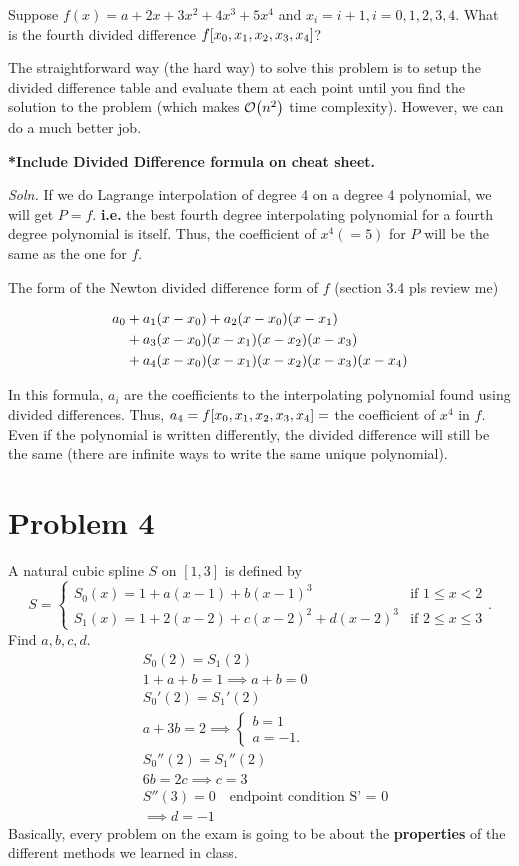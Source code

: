 \documentclass[12pt]{article}
\newcommand{\ie}{\textbf{i.e.}\xspace}
\newcommand{\soln}{\textit{Soln.}\xspace}
\begin{document}
Suppose $f(x) = a+2x+3x^2+4x^3+5x^4$ and $x_i = i+1, i=0,1,2,3,4$. What is the
fourth divided difference $f\bqty{x_0, x_1, x_2, x_3, x_4}$?

The straightforward way (the hard way) to solve this problem is to setup the
divided difference table and evaluate them at each point until you find the
solution to the problem (which makes $\order{n^2}$ time complexity). However,
we can do a much better job.

\textbf{*Include Divided Difference formula on cheat sheet.} 

\soln If we do Lagrange interpolation of degree 4 on a degree 4 polynomial, we
will get $P = f$. \ie the best fourth degree interpolating polynomial for a
fourth degree polynomial is itself. Thus, the coefficient of $x^4 ( = 5)$ for
$P$ will be the same as the one for $f$.

The form of the Newton divided difference form of $f$ (section 3.4 pls review me)

\begin{align*}
  a_0 &+ a_1\pqty{x-x_0} + a_2\pqty{x-x_0}\pqty{x-x_1} \\
      &+ a_3\pqty{x-x_0}\pqty{x-x_1}\pqty{x-x_2}\pqty{x-x_3} \\
      &+ a_4\pqty{x-x_0}\pqty{x-x_1}\pqty{x-x_2}\pqty{x-x_3}\pqty{x-x_4}
\end{align*}

In this formula, $a_i$ are the coefficients to the interpolating polynomial
found using divided differences. Thus, $a_4 = f\bqty{x_0, x_1, x_2, x_3, x_4} =$
the coefficient of $x^4$ in $f$. Even if the polynomial is written differently,
the divided difference will still be the same (there are infinite ways to write
the same unique polynomial).

\section{Problem 4}

A natural cubic spline $S$ on $[1,3]$ is defined by
\[
  S = \begin{cases}
    S_0(x) = 1+a(x-1)+b(x-1)^3 & \text{if } 1\leq x< 2\\
    S_1(x) = 1+2(x-2)+c(x-2)^2 + d(x-2)^3 & \text{if } 2\leq x\leq 3
  \end{cases}
.\]
Find $a,b,c,d$.
\begin{align*}
  &S_0(2) = S_1(2) \\
  &1+a+b = 1 \implies a+b=0 \\
  &S_0'(2) = S_1'(2) \\
  &a+3b = 2 \implies \begin{cases}
  b = 1 \\
  a = -1 
  .\end{cases} \\
  &S_0''(2) = S_1''(2) \\
  &6b  = 2c \implies c = 3 \\
  &S''(3) = 0 \quad \text{endpoint condition S' = 0} \\
  &\implies d = -1
\end{align*}
Basically, every problem on the exam is going to be about the
\textbf{properties} of the different methods we learned in class.
\end{document}
